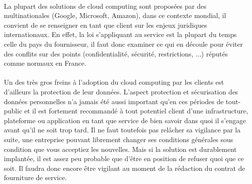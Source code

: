 \documentclass[a4paper,12pt]{report}
\begin{document}
\begin{onehalfspace}
	\paragraph*{}
	La plupart des solutions de cloud computing sont proposées par des multinationales (Google, Microsoft, Amazon), dans ce contexte mondial, il convient de se renseigner en tant que client sur les enjeux juridiques internationaux. En effet, la loi s’appliquant au service est la plupart du temps celle du pays du fournisseur, il faut donc examiner ce qui en découle pour éviter des conflits sur des points (confidentialité, sécurité, restrictions, ...) réputés comme normaux en France.
	
	\paragraph*{}
	Un des très gros freins à l’adoption du cloud computing par les clients est d’ailleurs la protection de leur données. L'aspect protection et sécurisation des données personnelles n'a jamais été aussi important qu'en ces périodes de tout-public et il est fortement recommandé à tout potentiel client d'une infrastructure, plateforme ou application en tant que service de bien savoir dans quoi il s'engage avant qu'il ne soit trop tard. Il ne faut toutefois pas relâcher sa vigilance par la suite, une entreprise pouvant librement changer ses conditions générales sous condition que vous acceptiez les nouvelles. Mais si la solution est durablement implantée, il est assez peu probable que d’être en position de refuser quoi que ce soit. Il faudra donc encore être vigilant au moment de la rédaction du contrat de fourniture de service.


\end{onehalfspace}
\end{document}
